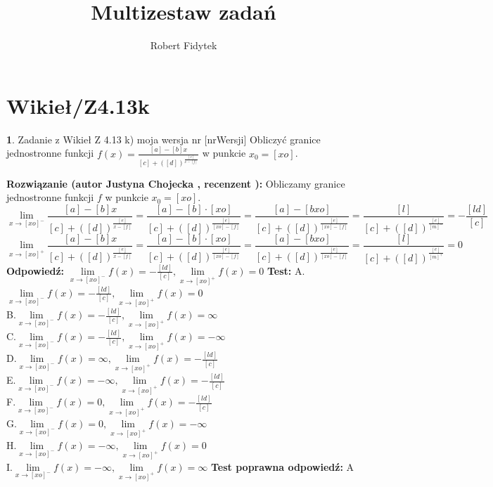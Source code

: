 \documentclass[12pt, a4paper]{article}
\title{Multizestaw zadań}
\author{Robert Fidytek}
\date{}
\theoremstyle{definition} %
\newtheorem{zad}{}
\newcommand{\kategoria}[1]{\section{#1}} %
\newcommand{\zadStart}[1]{\begin{zad}#1\newline} %
\newcommand{\zadStop}{\end{zad}}   %
\newcommand{\rozwStart}[2]{\noindent \textbf{Rozwiązanie (autor #1 , recenzent #2): }\newline} %
\newcommand{\rozwStop}{\newline}                                            %
\newcommand{\odpStart}{\noindent \textbf{Odpowiedź:}\newline}    %
\newcommand{\odpStop}{\newline}                                             %
\newcommand{\testStart}{\noindent \textbf{Test:}\newline} %
\newcommand{\testStop}{\newline} %
\newcommand{\kluczStart}{\noindent \textbf{Test poprawna odpowiedź:}\newline} %
\newcommand{\kluczStop}{\newline} %
\begin{document}
\maketitle


\kategoria{Wikieł/Z4.13k}
\zadStart{Zadanie z Wikieł Z 4.13 k) moja wersja nr [nrWersji]}
Obliczyć granice jednostronne funkcji $f(x)=\frac{[a]-[b]x}{[c]+([d])^{\frac{[e]}{x-[f]}}}$ w punkcie $x_{0}=[xo]$. 
\zadStop
\rozwStart{Justyna Chojecka}{}
Obliczamy granice jednostronne funkcji $f$ w punkcie $x_{0}=[xo]$.
$$\lim\limits_{x\to [xo]^{-}}\frac{[a]-[b]x}{[c]+([d])^{\frac{[e]}{x-[f]}}}=\frac{[a]-[b]\cdot[xo]}{[c]+([d])^{\frac{[e]}{[xo]-[f]}}}=\frac{[a]-[bxo]}{[c]+([d])^{\frac{[e]}{[xo]-[f]}}}=\frac{[l]}{[c]+([d])^{\frac{[e]}{[m]^{-}}}}=-\frac{[ld]}{[c]}$$
$$\lim\limits_{x\to [xo]^{+}}\frac{[a]-[b]x}{[c]+([d])^{\frac{[e]}{x-[f]}}}=\frac{[a]-[b]\cdot[xo]}{[c]+([d])^{\frac{[e]}{[xo]-[f]}}}=\frac{[a]-[bxo]}{[c]+([d])^{\frac{[e]}{[xo]-[f]}}}=\frac{[l]}{[c]+([d])^{\frac{[e]}{[m]^{+}}}}=0$$
\rozwStop
\odpStart
$\lim\limits_{x\to [xo]^{-}}f(x)=-\frac{[ld]}{[c]}, \lim\limits_{x\to [xo]^{+}}f(x)=0$
\odpStop
\testStart
A.$\lim\limits_{x\to [xo]^{-}}f(x)=-\frac{[ld]}{[c]}, \lim\limits_{x\to [xo]^{+}}f(x)=0$\\
B.$\lim\limits_{x\to [xo]^{-}}f(x)=-\frac{[ld]}{[c]}, \lim\limits_{x\to [xo]^{+}}f(x)=\infty$\\
C.$\lim\limits_{x\to [xo]^{-}}f(x)=-\frac{[ld]}{[c]}, \lim\limits_{x\to [xo]^{+}}f(x)=-\infty$\\
D.$\lim\limits_{x\to [xo]^{-}}f(x)=\infty, \lim\limits_{x\to [xo]^{+}}f(x)=-\frac{[ld]}{[c]}$\\
E.$\lim\limits_{x\to [xo]^{-}}f(x)=-\infty, \lim\limits_{x\to [xo]^{+}}f(x)=-\frac{[ld]}{[c]}$\\
F.$\lim\limits_{x\to [xo]^{-}}f(x)=0, \lim\limits_{x\to [xo]^{+}}f(x)=-\frac{[ld]}{[c]}$\\
G.$\lim\limits_{x\to [xo]^{-}}f(x)=0, \lim\limits_{x\to [xo]^{+}}f(x)=-\infty$\\
H.$\lim\limits_{x\to [xo]^{-}}f(x)=-\infty, \lim\limits_{x\to [xo]^{+}}f(x)=0$\\
I.$\lim\limits_{x\to [xo]^{-}}f(x)=-\infty, \lim\limits_{x\to [xo]^{+}}f(x)=\infty$
\testStop
\kluczStart
A
\kluczStop
\end{document}
